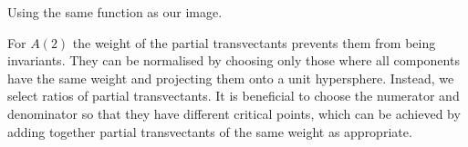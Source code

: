 
Using the same function as our image. 

For $A(2)$ the weight of the partial transvectants prevents them from being invariants. They can be normalised by choosing only those where all components have the same weight and projecting them onto a unit hypersphere. Instead, we select ratios of partial transvectants. It is beneficial to choose the numerator and denominator so that they have different critical points, which can be achieved by adding together partial transvectants of the same weight as appropriate.
